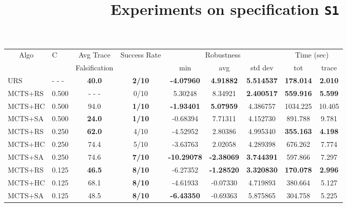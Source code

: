 \documentclass[11pt]{article}
\begin{document}
\begin{table}[ht]
\centering
\title{Experiments on specification \texttt{S1}}
\begin{tabular}{|l|l|c|c|c|c|c|c|c|}
\hline
\multicolumn{1}{|c|}{\multirow{2}{*}{Algo}} & \multirow{2}{*}{C} & Avg Trace               & \multirow{2}{*}{Success Rate} & \multicolumn{3}{c|}{Robustness} & \multicolumn{2}{c|}{Time (sec)} \\ \cline{5-9} 
\multicolumn{1}{|c|}{}                      &                    & Falsification           &                               & min       & avg      & std dev  & tot        & trace        \\ \hline
URS                                         & - - -              & \textbf{40.0}           & \textbf{2/10}                 & \textbf{-4.07960}    & \textbf{4.91882}
                                            & \textbf{5.514537}  & \textbf{178.014}        & \textbf{2.010}    \\ \hline
MCTS+RS                                     & 0.500              & - - -                   & 0/10                          &  5.30248  & 8.34921  & \textbf{2.400517} &  \textbf{559.916} &  \textbf{5.599}    \\
MCTS+HC                                     & 0.500              &  94.0                   & \textbf{1/10}                 & \textbf{-1.93401}  & \textbf{5.07959} & 4.386757 & 1034.225 & 10.405    \\
MCTS+SA                                     & 0.500              &  \textbf{24.0}          & \textbf{1/10}                 & -0.68394           & 7.71311          & 4.152730 &  891.788 &  9.781    \\ \hline

MCTS+RS                                     & 0.250              &  \textbf{62.0}          & 4/10                          & -4.52952  &  2.80386 & 4.995340 &  \textbf{355.163} &  \textbf{4.198}    \\
MCTS+HC                                     & 0.250              &  74.4                   & 5/10                          & -3.63763  &  2.02058 & 4.289398 &  676.262 &  7.774    \\
MCTS+SA                                     & 0.250              &  74.6                   & \textbf{7/10}                          & \textbf{-10.29078} & \textbf{-2.38069} & \textbf{3.744391} &  597.866 &  7.297    \\ \hline

MCTS+RS                                     & 0.125              &  \textbf{46.5}          & \textbf{8/10}                          & -6.27352  & \textbf{-1.28520} & \textbf{3.320830} &  \textbf{170.078} &  \textbf{2.996}    \\
MCTS+HC                                     & 0.125              &  68.1                   & \textbf{8/10}                         & -4.61933  & -0.07330 & 4.719893 &  380.664 &  5.127    \\
MCTS+SA                                     & 0.125              &  48.5                   & \textbf{8/10}                         & \textbf{-6.43350}  & -0.69363 & 5.875865 &  304.758 &  5.225    \\ \hline


\end{tabular}
\end{table}
\end{document}
